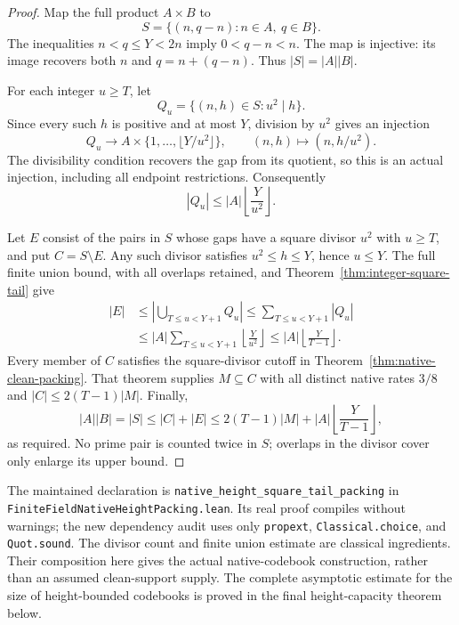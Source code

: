 \documentclass[11pt]{article}
\begin{document}
\begin{proof}
Map the full product \(A\times B\) to
\[
 S=\{(n,q-n):n\in A,\ q\in B\}.
\]
The inequalities \(n<q\le Y<2n\) imply \(0<q-n<n\).
The map is injective: its image recovers both \(n\) and
\(q=n+(q-n)\). Thus \(|S|=|A||B|\).

For each integer \(u\ge T\), let
\[
 Q_u=\{(n,h)\in S:u^2\mid h\}.
\]
Since every such \(h\) is positive and at most \(Y\), division by
\(u^2\) gives an injection
\[
 Q_u\longrightarrow
 A\times\{1,\ldots,\lfloor Y/u^2\rfloor\},\qquad
 (n,h)\longmapsto(n,h/u^2).
\]
The divisibility condition recovers the gap from its quotient,
so this is an actual injection, including all endpoint restrictions.
Consequently
\[
 |Q_u|\le |A|\left\lfloor\frac{Y}{u^2}\right\rfloor.
\]

Let \(E\) consist of the pairs in \(S\) whose gaps have a square
divisor \(u^2\) with \(u\ge T\), and put \(C=S\setminus E\).
Any such divisor satisfies \(u^2\le h\le Y\), hence \(u\le Y\).
The full finite union bound, with all overlaps retained, and
Theorem~\ref{thm:integer-square-tail} give
\begin{align*}
 |E|
 &\le\left|\bigcup_{T\le u<Y+1}Q_u\right|
 \le\sum_{T\le u<Y+1}|Q_u|\\
 &\le |A|\sum_{T\le u<Y+1}
          \left\lfloor\frac{Y}{u^2}\right\rfloor
 \le |A|\left\lfloor\frac{Y}{T-1}\right\rfloor.
\end{align*}
Every member of \(C\) satisfies the square-divisor cutoff in
Theorem~\ref{thm:native-clean-packing}. That theorem supplies
\(M\subseteq C\) with all distinct native rates \(3/8\) and
\(|C|\le2(T-1)|M|\). Finally,
\[
 |A||B|=|S|\le |C|+|E|
 \le 2(T-1)|M|+|A|
                  \left\lfloor\frac{Y}{T-1}\right\rfloor,
\]
as required. No prime pair is counted twice in \(S\); overlaps in
the divisor cover only enlarge its upper bound.
\end{proof}

The maintained declaration is
\texttt{native\_height\_square\_tail\_packing} in
\texttt{FiniteFieldNativeHeightPacking.\allowbreak lean}.
Its real proof compiles without warnings; the new dependency audit
uses only \texttt{propext}, \texttt{Classical.choice}, and
\texttt{Quot.sound}. The divisor count and finite union estimate
are classical ingredients. Their composition here gives the
actual native-codebook construction, rather than an assumed
clean-support supply. The complete asymptotic estimate for the size of
height-bounded codebooks is proved in the final height-capacity theorem below.
\end{document}
